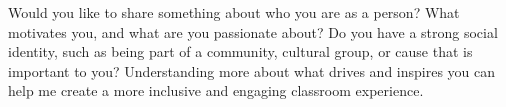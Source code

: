 \documentclass{ximera}
\author{Bart Snapp}
\begin{document}
\begin{question}
Would you like to share something about who you are as a person? What
motivates you, and what are you passionate about? Do you have a strong
social identity, such as being part of a community, cultural group, or cause that
is important to you? Understanding more about what drives and inspires you can help me create a more inclusive and engaging classroom experience.
\begin{freeResponse}
\end{freeResponse}
\end{question}
\end{document}
